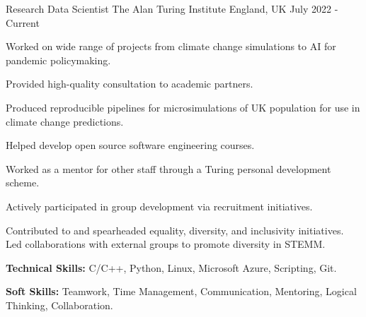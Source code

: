 

\begin{cventries}

  \cventry
    {Research Data Scientist} %
    {The Alan Turing Institute} %
    {England, UK} %
    {July 2022 - Current} %
    {
      \begin{cvitems} %
        \item {Worked on wide range of projects from climate change simulations to AI for pandemic policymaking.}
        \item {Provided high-quality consultation to academic partners.}
        \item {Produced reproducible pipelines for microsimulations of UK population for use in climate change predictions.}
        \item {Helped develop open source software engineering courses.}
        \item {Worked as a mentor for other staff through a Turing personal development scheme.}
        \item {Actively participated in group development via recruitment initiatives.}
        \item {Contributed to and spearheaded equality, diversity, and inclusivity initiatives. Led collaborations with external groups to promote diversity in STEMM.}
        \item {\textbf{Technical Skills:} C/C++, Python, Linux, Microsoft Azure, Scripting, Git.}
        \item {\textbf{Soft Skills:} Teamwork, Time Management, Communication, Mentoring, Logical Thinking, Collaboration.}
      \end{cvitems}
    }


\end{cventries}
